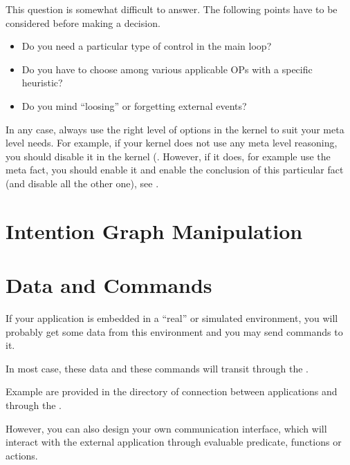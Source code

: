 This question is somewhat difficult to answer. The following points have to
be considered before making a decision.

\begin{itemize}

\item Do you need a particular type of control in the main loop?

\item Do you have to choose among various applicable OPs with a specific
heuristic?

\item Do you mind ``loosing'' or forgetting external events?

\end{itemize}

In any case, always use the right level of options in the kernel to suit
your meta level needs. For example, if your kernel does not use any meta
level reasoning, you should disable it in the kernel (. However, if it does, for example use the  meta
fact, you should enable it and enable the conclusion of this particular
fact (and disable all the other one), see .

\section{Intention Graph Manipulation}


\section{Data and Commands}

If your \OPRS{} application is embedded in a ``real'' or simulated
environment, you will probably get some data from this environment and
you may send commands to it.

In most case, these data and these commands will transit through the
\MPA{}.

Example are provided in the  directory of connection between
applications and \CPK{} through the \MPA{}.

However, you can also design your own communication interface, which will
interact with the external application through evaluable predicate, functions
or actions.

